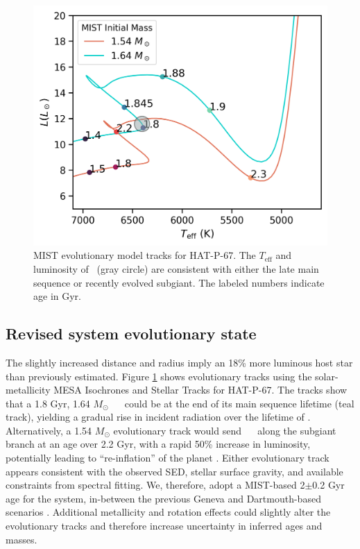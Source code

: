 \documentclass[twocolumn]{aastex631}
\newcommand{\hatp}{\object{HAT-P-67}~}
\newcommand{\hatpb}{\object{HAT-P-67 b}}
\begin{document}


\begin{figure}
    \centering
    \includegraphics[width=0.98\linewidth]{figures/MIST_only_HATP.png}
    \caption{MIST evolutionary model tracks for HAT-P-67.  The $T_\mathrm{eff}$ and luminosity of \hatp (gray circle) are consistent with either the late main sequence or recently evolved subgiant.  The labeled numbers indicate age in Gyr.}
    \label{fig:evolTracks}
\end{figure}

\subsection{Revised system evolutionary state}\label{secMISTtracks}
The slightly increased distance and radius imply an 18\% more luminous host star than previously estimated.  Figure \ref{fig:evolTracks} shows evolutionary tracks using the solar-metallicity MESA \citep{2011ApJS..192....3P,2013ApJS..208....4P,2015ApJS..220...15P} Isochrones and Stellar Tracks \citep[MIST;][]{2016ApJS..222....8D,2016ApJ...823..102C} for HAT-P-67.  The tracks show that a 1.8 Gyr, 1.64 $M_\odot$ \hatp~ could be at the end of its main sequence lifetime (teal track), yielding a gradual rise in incident radiation over the lifetime of \hatpb.  Alternatively, a 1.54 $M_\odot$ evolutionary track would send \hatp~ along the subgiant branch at an age over 2.2 Gyr, with a rapid 50\% increase in luminosity, potentially leading to ``re-inflation'' of the planet \citep{2021ApJ...909L..16T}.  Either evolutionary track appears consistent with the observed SED, stellar surface gravity, and available constraints from spectral fitting.  We, therefore, adopt a MIST-based 2$\pm$0.2 Gyr age for the system, in-between the previous Geneva and Dartmouth-based scenarios \citep{2017AJ....153..211Z}.  Additional metallicity and rotation effects could slightly alter the evolutionary tracks and therefore increase uncertainty in inferred ages and masses.
\end{document}
